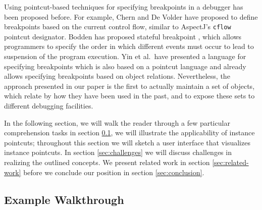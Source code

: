 Using pointcut-based techniques for specifying breakpoints in a debugger has been proposed before.
For example, Chern and De Volder \cite{Chern2007} have proposed to define breakpoints based on the current control flow, similar to AspectJ's \lstinline!cflow! pointcut designator.
Bodden has proposed stateful breakpoint \cite{Bodden2011}, which allows programmers to specify the order in which different events must occur to lead to suspension of the program execution.
Yin et al.\ have presented a language for specifying breakpoints \cite{Yin2013} which is also based on a pointcut language and already allows specifying breakpoints based on object relations.
Nevertheless, the approach presented in our paper is the first to actually maintain a set of objects, which relate by how they have been used in the past, and to expose these sets to different debugging facilities.


In the following section, we will walk the reader through a few particular comprehension tasks in section \ref{sec:walkthrough}, we will illustrate the applicability of instance pointcuts;
throughout this section we will sketch a user interface that visualizes instance pointcuts.
In section \ref{sec:challenges} we will discuss challenges in realizing the outlined concepts.
We present related work in section \ref{sec:related-work} before we conclude our position in section \ref{sec:conclusion}.

\subsection{Example Walkthrough}
\label{sec:walkthrough}

